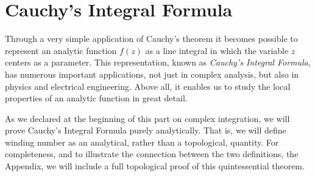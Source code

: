 \chapter{Cauchy's Integral Formula}
\label{chap:cauchy-integral-formula}
Through a very simple application of Cauchy's theorem it becomes possible to represent an analytic function $f(z)$ as a line integral in which the variable $z$ centers as a parameter. This representation, known as \textit{Cauchy's Integral Formula}, has numerous important applications, not just in complex analysis, but also in physics and electrical engineering. Above all, it enables us to study the local properties of an analytic function in great detail.

As we declared at the beginning of this part on complex integration, we will prove Cauchy's Integral Formula purely analytically. That is, we will define winding number as an analytical, rather than a topological, quantity. For completeness, and to illustrate the connection between the two definitions, the Appendix, we will include a full topological proof of this quintessential theorem.

